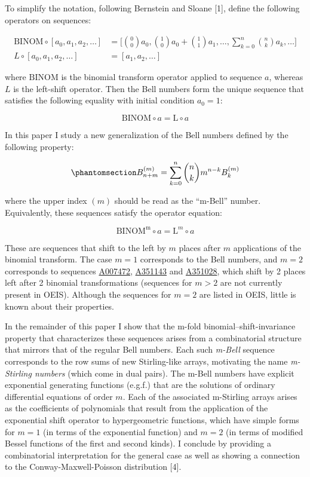 \documentclass[
  letterpaper,
  DIV=11,
  numbers=noendperiod]{scrartcl}
\theoremstyle{plain}
\theoremstyle{remark}
\begin{document}
To simplify the notation, following Bernstein and Sloane {[}1{]}, define
the following operators on sequences:

\[
\begin{aligned}
\mathrm{BINOM} \circ [a_0,a_1,a_2, \dots] &= \bigg[\binom{0}{0}a_0,\binom{1}{0}a_0+\binom{1}{1}a_1, \ldots, \sum_{k=0}^n\binom{n}{k}a_k, \ldots \bigg] \\
L \circ [a_0,a_1,a_2, \ldots] &= [a_1,a_2, \ldots]
\end{aligned}
\]

where \(\mathrm{BINOM}\) is the binomial transform operator applied to
sequence \(a\), whereas \(L\) is the left-shift operator. Then the Bell
numbers form the unique sequence that satisfies the following equality
with initial condition \(a_0 = 1:\)

\[
\mathrm{BINOM} \circ a = \mathrm{L} \circ a
\]

In this paper I study a new generalization of the Bell numbers defined
by the following property:

\begin{equation}\phantomsection\label{eq-mbell-recurrence}{
B^{(m)}_{n+m} = \sum_{k=0}^n \binom{n}{k} m^{n-k} B_k^{(m)}
}\end{equation}

where the upper index \((m)\) should be read as the ``m-Bell'' number.
Equivalently, these sequences satisfy the operator equation:

\[
\mathrm{BINOM^m} \circ a = \mathrm{L}^m \circ a
\]

These are sequences that shift to the left by \(m\) places after \(m\)
applications of the binomial transform. The case \(m=1\) corresponds to
the Bell numbers, and \(m=2\) corresponds to sequences
\href{https://oeis.org/A007472}{A007472},
\href{https://oeis.org/search?q=1,0,1,2,5,16&language=english&go=Search}{A351143}
and \href{https://oeis.org/A351028}{A351028}, which shift by 2 places
left after 2 binomial transformations (sequences for \(m>2\) are not
currently present in OEIS). Although the sequences for \(m=2\) are
listed in OEIS, little is known about their properties.

In the remainder of this paper I show that the m-fold
binomial--shift-invariance property that characterizes these sequences
arises from a combinatorial structure that mirrors that of the regular
Bell numbers. Each such \emph{m-Bell} sequence corresponds to the row
sums of new Stirling-like arrays, motivating the name \emph{m-Stirling
numbers} (which come in dual pairs). The m-Bell numbers have explicit
exponential generating functions (e.g.f.) that are the solutions of
ordinary differential equations of order \(m\). Each of the associated
m-Stirling arrays arises as the coefficients of polynomials that result
from the application of the exponential shift operator to hypergeometric
functions, which have simple forms for \(m=1\) (in terms of the
exponential function) and \(m=2\) (in terms of modified Bessel functions
of the first and second kinds). I conclude by providing a combinatorial
interpretation for the general case as well as showing a connection to
the Conway-Maxwell-Poisson distribution {[}4{]}.
\end{document}

